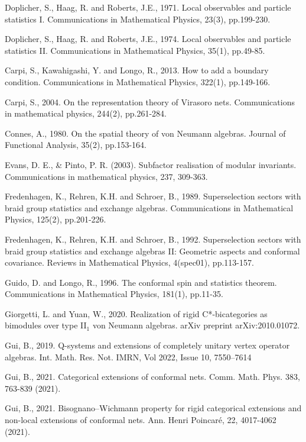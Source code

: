\documentclass[11pt,b5paper,notitlepage]{article}
\theoremstyle{definition}
\theoremstyle{plain}
\numberwithin{equation}{section}
\begin{document}
\begin{thebibliography}{999999}
Doplicher, S., Haag, R. and Roberts, J.E., 1971. Local observables and particle statistics I. Communications in Mathematical Physics, 23(3), pp.199-230.

Doplicher, S., Haag, R. and Roberts, J.E., 1974. Local observables and particle statistics II. Communications in Mathematical Physics, 35(1), pp.49-85.

Carpi, S., Kawahigashi, Y. and Longo, R., 2013. How to add a boundary condition. Communications in Mathematical Physics, 322(1), pp.149-166.

Carpi, S., 2004. On the representation theory of Virasoro nets. Communications in mathematical physics, 244(2), pp.261-284.

Connes, A., 1980. On the spatial theory of von Neumann algebras. Journal of Functional Analysis, 35(2), pp.153-164.

Evans, D. E., \& Pinto, P. R. (2003). Subfactor realisation of modular invariants. Communications in mathematical physics, 237, 309-363.

Fredenhagen, K., Rehren, K.H. and Schroer, B., 1989. Superselection sectors with braid group statistics and exchange algebras. Communications in Mathematical Physics, 125(2), pp.201-226.

Fredenhagen, K., Rehren, K.H. and Schroer, B., 1992. Superselection sectors with braid group statistics and exchange algebras II: Geometric aspects and conformal covariance. Reviews in Mathematical Physics, 4(spec01), pp.113-157.

Guido, D. and Longo, R., 1996. The conformal spin and statistics theorem. Communications in Mathematical Physics, 181(1), pp.11-35.

Giorgetti, L. and Yuan, W., 2020. Realization of rigid C*-bicategories as bimodules over type II$_1 $ von Neumann algebras. arXiv preprint arXiv:2010.01072.


Gui, B., 2019. Q-systems and extensions of completely unitary vertex operator algebras. Int. Math. Res. Not. IMRN, Vol 2022, Issue 10, 7550–7614

Gui, B., 2021. Categorical extensions of conformal nets. Comm. Math. Phys. 383, 763-839 (2021).

Gui, B., 2021. Bisognano–Wichmann property for rigid categorical extensions and non-local extensions of conformal nets. Ann. Henri Poincaré, 22, 4017-4062 (2021).





\end{thebibliography}
\end{document}

